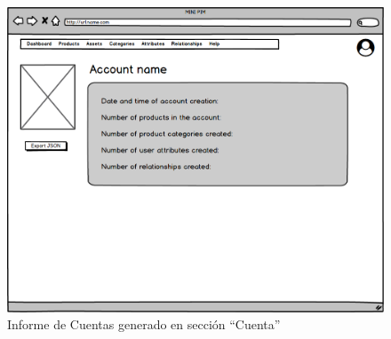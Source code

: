 \begin{figure}[H]
    \includegraphics[width=1\linewidth]{mockups/RF1.9CrearInformeCuenta.png}
    \caption{Informe de Cuentas generado en sección \enquote{Cuenta}}
   \end{figure}
\vspace{1.0cm}

\newpage %